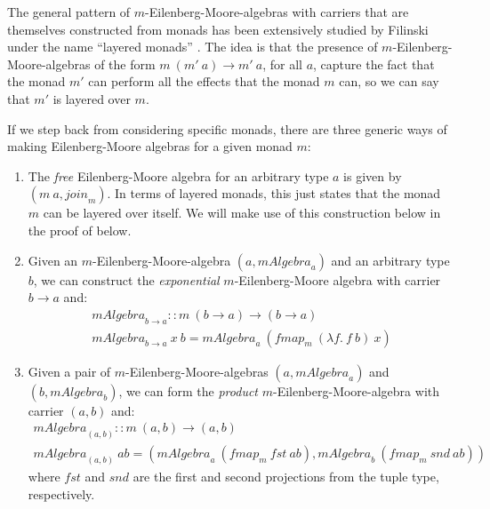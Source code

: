 The general pattern of $m$-Eilenberg-Moore-algebras with carriers that
are themselves constructed from monads has been extensively studied by
Filinski under the name ``layered monads''
\cite{filinski99representing}. The idea is that the presence of
$m$-Eilenberg-Moore-algebras of the form $m~(m'~a) \to m'~a$, for all
$a$, capture the fact that the monad $m'$ can perform all the effects
that the monad $m$ can, so we can say that $m'$ is layered over $m$.

If we step back from considering specific monads, there are three
generic ways of making Eilenberg-Moore algebras for a given monad $m$:
\begin{enumerate}
\item The \emph{free} Eilenberg-Moore algebra for an arbitrary type
  $a$ is given by $(m~a, \mathit{join}_m)$. In terms of layered
  monads, this just states that the monad $m$ can be layered over
  itself. We will make use of this construction below in the proof of
   below.
\item Given an $m$-Eilenberg-Moore-algebra $(a, \mathit{mAlgebra}_a)$
  and an arbitrary type $b$, we can construct the \emph{exponential}
  $m$-Eilenberg-Moore algebra with carrier $b \to a$ and:
  \begin{displaymath}
    \begin{array}{l}
      \mathit{mAlgebra}_{b \to a} :: m~(b \to a) \to (b \to a) \\
      \mathit{mAlgebra}_{b \to a}~x~b = \mathit{mAlgebra}_a~(\mathit{fmap}_m~(\lambda f.~f~b)~x)
    \end{array}
  \end{displaymath}
\item Given a pair of $m$-Eilenberg-Moore-algebras $(a,
  \mathit{mAlgebra}_a)$ and $(b, \mathit{mAlgebra}_b)$, we can form
  the \emph{product} $m$-Eilenberg-Moore-algebra with carrier $(a,b)$
  and:
  \begin{displaymath}
    \begin{array}{l}
      \mathit{mAlgebra}_{(a,b)} :: m~(a,b) \to (a,b) \\
      \mathit{mAlgebra}_{(a,b)}~\mathit{ab} = (\mathit{mAlgebra}_a~(\mathit{fmap}_m~\mathit{fst}~\mathit{ab}), \mathit{mAlgebra}_b~(\mathit{fmap}_m~\mathit{snd}~\mathit{ab}))
    \end{array}
  \end{displaymath}
  where $\mathit{fst}$ and $\mathit{snd}$ are the first and second
  projections from the tuple type, respectively.
\end{enumerate}

